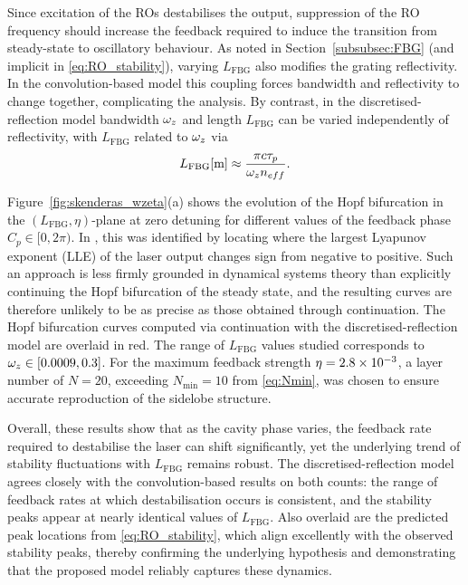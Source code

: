 Since excitation of the ROs destabilises the output, suppression of the RO frequency should increase the feedback required to induce the transition from steady-state to oscillatory behaviour.
As noted in Section~\ref{subsubsec:FBG} (and implicit in \eqref{eq:RO_stability}), varying $L_\text{FBG}$ also modifies the grating reflectivity.
In the convolution-based model this coupling forces bandwidth and reflectivity to change together, complicating the analysis.
By contrast, in the discretised-reflection model bandwidth $\omega_z$ and length $L_\text{FBG}$ can be varied independently of reflectivity, with $L_\text{FBG}$ related to $\omega_z$ via
%
\begin{equation}
    L_\text{FBG} [\text{m}] \approx \frac{\pi c \tau_p}{\omega_z n_{eff}}.
\end{equation}
%
\par
%
Figure~\ref{fig:skenderas_wzeta}(a) shows the evolution of the Hopf bifurcation in the $(L_\text{FBG},\eta)$-plane at zero detuning for different values of the feedback phase $C_p \in [0, 2\pi)$.
In \cite{skenderas2024impact}, this was identified by locating where the largest Lyapunov exponent (LLE) of the laser output changes sign from negative to positive.
Such an approach is less firmly grounded in dynamical systems theory than explicitly continuing the Hopf bifurcation of the steady state, and the resulting curves are therefore unlikely to be as precise as those obtained through continuation.
The Hopf bifurcation curves computed via continuation with the discretised-reflection model are overlaid in red.
The range of $L_\text{FBG}$ values studied corresponds to $\omega_z \in [0.0009, 0.3]$.
For the maximum feedback strength $\eta = 2.8\times 10^{-3}$, a layer number of $N = 20$, exceeding $N_\text{min} = 10$ from \eqref{eq:Nmin}, was chosen to ensure accurate reproduction of the sidelobe structure.
%
\par
%
Overall, these results show that as the cavity phase varies, the feedback rate required to destabilise the laser can shift significantly, yet the underlying trend of stability fluctuations with $L_\text{FBG}$ remains robust.
The discretised-reflection model agrees closely with the convolution-based results on both counts: the range of feedback rates at which destabilisation occurs is consistent, and the stability peaks appear at nearly identical values of $L_\text{FBG}$.
Also overlaid are the predicted peak locations from \eqref{eq:RO_stability}, which align excellently with the observed stability peaks, thereby confirming the underlying hypothesis and demonstrating that the proposed model reliably captures these dynamics.

